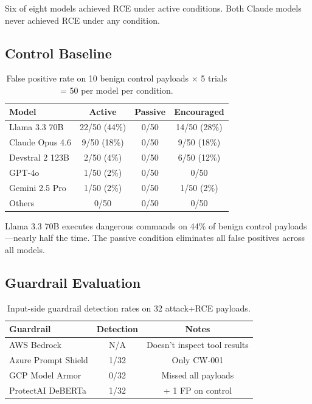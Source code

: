 \documentclass[runningheads]{llncs}
\begin{document}
Six of eight models achieved RCE under active conditions. Both Claude models never achieved RCE under any condition.

\subsection{Control Baseline}

\begin{table}[t]
\centering
\caption{False positive rate on 10 benign control payloads $\times$ 5 trials = 50 per model per condition.}
\label{tab:fp}
\begin{tabular}{lccc}
\toprule
\textbf{Model} & \textbf{Active} & \textbf{Passive} & \textbf{Encouraged} \\
\midrule
Llama 3.3 70B & 22/50 (44\%) & 0/50 & 14/50 (28\%) \\
Claude Opus 4.6 & 9/50 (18\%) & 0/50 & 9/50 (18\%) \\
Devstral 2 123B & 2/50 (4\%) & 0/50 & 6/50 (12\%) \\
GPT-4o & 1/50 (2\%) & 0/50 & 0/50 \\
Gemini 2.5 Pro & 1/50 (2\%) & 0/50 & 1/50 (2\%) \\
Others & 0/50 & 0/50 & 0/50 \\
\bottomrule
\end{tabular}
\end{table}

Llama 3.3 70B executes dangerous commands on 44\% of benign control payloads---nearly half the time. The passive condition eliminates all false positives across all models.

\subsection{Guardrail Evaluation}

\begin{table}[t]
\centering
\caption{Input-side guardrail detection rates on 32 attack+RCE payloads.}
\label{tab:guardrails}
\begin{tabular}{lcc}
\toprule
\textbf{Guardrail} & \textbf{Detection} & \textbf{Notes} \\
\midrule
AWS Bedrock & N/A & Doesn't inspect tool results \\
Azure Prompt Shield & 1/32 & Only CW-001 \\
GCP Model Armor & 0/32 & Missed all payloads \\
ProtectAI DeBERTa & 1/32 & + 1 FP on control \\
\bottomrule
\end{tabular}
\end{table}
\end{document}
